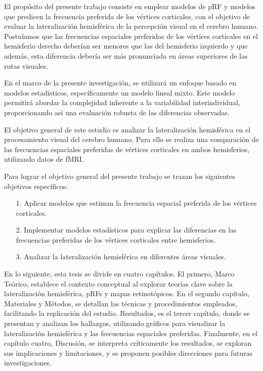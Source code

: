 El propósito del presente trabajo consiste en emplear modelos de pRF y modelos que predicen la frecuencia preferida de los v\'ertices corticales, con el objetivo de evaluar la lateralización hemisférica de la percepci\'on visual en el cerebro humano. Postulamos que las frecuencias espaciales preferidas de los v\'ertices corticales en el hemisferio derecho deberían ser menores que las del hemisferio izquierdo y que además, esta diferencia debería ser más pronunciada en áreas superiores de las rutas  visuales.


En el marco de la presente investigación, se utilizará un enfoque basado en modelos estadísticos, específicamente un modelo lineal mixto. Este modelo permitirá abordar la complejidad inherente a la variabilidad interindividual, proporcionando así una evaluación robusta de las diferencias observadas.

El objetivo general de este estudio es analizar la lateralización hemisférica en el procesamiento visual del cerebro humano. Para ello se realiza una comparación de las frecuencias espaciales preferidas de v\'ertices corticales en ambos hemisferios, utilizando datos de fMRI.

Para lograr el objetivo general del presente trabajo se
trazan los siguientes objetivos específicos:

\begin{itemize}	
	\item[1.]  Aplicar modelos que estiman la frecuencia espacial preferida de los v\'ertices corticales.
	
	\item[2.] Implementar modelos estadísticos para explicar las diferencias en las frecuencias preferidas de los v\'ertices corticales entre hemisferios.	
	
	\item[3.] Analizar la lateralización hemisférica en diferentes áreas visuales.
	
	
\end{itemize}

En lo siguiente, esta tesis se divide en cuatro capítulos. El primero, Marco Teórico, establece el contexto conceptual al explorar teorías clave sobre la lateralización hemisférica, pRFs y mapas retinot\'opicos. En el segundo cap\'itulo, Materiales y Métodos, se detallan las técnicas y procedimientos empleados, facilitando la replicación del estudio. Resultados, es el tercer cap\'itulo, donde se presentan y analizan los hallazgos, utilizando gráficos para visualizar la lateralización hemisférica y las frecuencias espaciales preferidas. Finalmente, en el capítulo cuatro, Discusión, se interpreta críticamente los resultados, se exploran sus implicaciones y limitaciones, y se proponen posibles direcciones para futuras investigaciones.


 
	




